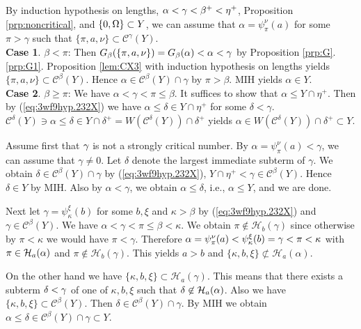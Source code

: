 \documentclass{article}
\begin{document}
By induction hypothesis on lengths, $\alpha<\gamma<\beta^{+}<\eta^{+}$,
Proposition \ref{prp:noncritical}, and $\{0,\Omega\}\subset Y$, 
 we can assume that
$\alpha=\psi_{\pi}^{\nu}(a)$ for some $\pi>\gamma$ such that
 $\{\pi,a,\nu\}\subset\mathcal{C}^{\gamma}(Y)$.
\\
\textbf{Case 1}. $\beta<\pi$: 
Then $G_{\beta}(\{\pi,a,\nu\})=G_{\beta}(\alpha)<\alpha<\gamma$ by Proposition \ref{prp:G}.\ref{prp:G1}.
 Proposition \ref{lem:CX3} with induction hypothesis on lengths yields 
$\{\pi,a,\nu\}\subset\mathcal{C}^{\beta}(Y)$.
Hence $\alpha\in \mathcal{C}^{\beta}(Y)\cap\gamma$ by $\pi>\beta$.
MIH yields $\alpha\in Y$.
\\
\textbf{Case 2}. $\beta\geq\pi$: 
We have $\alpha<\gamma<\pi\leq\beta$. 
It suffices to show that $\alpha\leq Y\cap\eta^{+}$.
Then by (\ref{eq:3wf9hyp.232X}) we have $\alpha\leq\delta\in Y\cap\eta^{+}$ for some $\delta<\gamma$.
$\mathcal{C}^{\delta}(Y)\ni\alpha\leq\delta\in Y\cap\delta^{+}=W(\mathcal{C}^{\delta}(Y))\cap\delta^{+}$
yields $\alpha\in W(\mathcal{C}^{\delta}(Y))\cap\delta^{+}\subset Y$.

Assume first that $\gamma$ is not a strongly critical number.
By $\alpha=\psi_{\pi}^{\nu}(a)<\gamma$,
we can assume that 
$\gamma\neq 0$.
Let $\delta$ denote the largest immediate subterm of $\gamma$.
We obtain $\delta\in \mathcal{C}^{\beta}(Y)\cap\gamma$
by (\ref{eq:3wf9hyp.232X}), 
$Y\cap\eta^{+}<\gamma\in\mathcal{C}^{\beta}(Y)$.
Hence $\delta\in Y$ by MIH.
Also by $\alpha<\gamma$, we obtain $\alpha\leq\delta$, i.e., $\alpha\leq Y$, and we are done.



Next let $\gamma=\psi_{\kappa}^{\xi}(b)$ for some $b,\xi$ and $\kappa>\beta$ by (\ref{eq:3wf9hyp.232X}) and $\gamma\in \mathcal{C}^{\beta}(Y)$.
We have $\alpha<\gamma<\pi\leq\beta<\kappa$.
We obtain
$\pi\not\in\mathcal{H}_{b}(\gamma)$ since otherwise by $\pi<\kappa$ we would have $\pi<\gamma$.
Therefore $\alpha=\psi_{\pi}^{\nu}(a) <\psi_{\kappa}^{\xi}(b)=\gamma<\pi<\kappa$ with 
$\pi\in\mathcal{H}_{a}(\alpha)$ and $\pi\not\in\mathcal{H}_{b}(\gamma)$. This
yields $a> b$ and 
$\{\kappa,b,\xi\}\not\subset\mathcal{H}_{a}(\alpha)$.

On the other hand we have 
$\{\kappa,b,\xi\}\subset\mathcal{H}_{a}(\gamma)$.
This means that there exists a subterm
$\delta<\gamma$ of one of $\kappa,b,\xi$
such that $\delta\not\in\mathcal{H}_{a}(\alpha)$.
Also we have $\{\kappa,b,\xi\}\subset\mathcal{C}^{\beta}(Y)$.
Then $\delta\in\mathcal{C}^{\beta}(Y)\cap\gamma$.
By MIH
we obtain 
$\alpha\leq\delta\in \mathcal{C}^{\beta}(Y)\cap\gamma\subset Y$.
\end{document}
